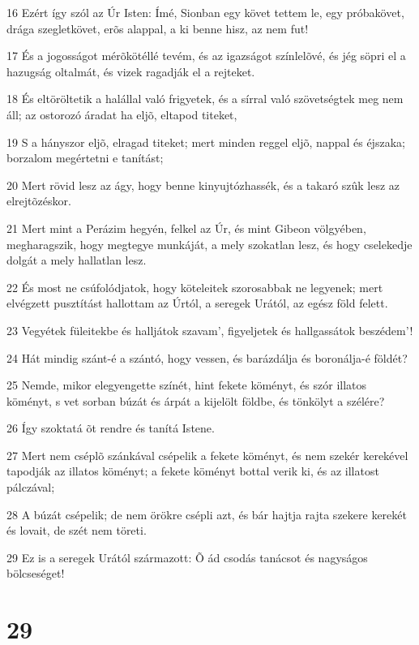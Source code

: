 \par 16 Ezért így szól az Úr Isten: Ímé, Sionban egy követ tettem le, egy próbakövet, drága szegletkövet, erõs alappal, a ki benne hisz, az nem fut!
\par 17 És a jogosságot mérõkötéllé tevém, és az igazságot színlelõvé, és jég söpri el a hazugság oltalmát, és vizek ragadják el a rejteket.
\par 18 És eltöröltetik a halállal való frigyetek, és a sírral való szövetségtek meg nem áll; az ostorozó áradat ha eljõ, eltapod titeket,
\par 19 S a hányszor eljõ, elragad titeket; mert minden reggel eljõ, nappal és éjszaka; borzalom megértetni e tanítást;
\par 20 Mert rövid lesz az ágy, hogy benne kinyujtózhassék, és a takaró szûk lesz az elrejtõzéskor.
\par 21 Mert mint a Perázim hegyén, felkel az Úr, és mint Gibeon völgyében, megharagszik, hogy megtegye munkáját, a mely szokatlan lesz, és hogy cselekedje dolgát a mely hallatlan lesz.
\par 22 És most ne csúfolódjatok, hogy köteleitek szorosabbak ne legyenek; mert elvégzett pusztítást hallottam az Úrtól, a seregek Urától, az egész föld felett.
\par 23 Vegyétek füleitekbe és halljátok szavam', figyeljetek és hallgassátok beszédem'!
\par 24 Hát mindig szánt-é a szántó, hogy vessen, és barázdálja és boronálja-é földét?
\par 25 Nemde, mikor elegyengette színét, hint fekete köményt, és szór illatos köményt, s vet sorban búzát és árpát a kijelölt földbe, és tönkölyt a szélére?
\par 26 Így szoktatá õt rendre és tanítá Istene.
\par 27 Mert nem cséplõ szánkával csépelik a fekete köményt, és nem szekér kerekével tapodják az illatos köményt; a fekete köményt bottal verik ki, és az illatost pálczával;
\par 28 A búzát csépelik; de nem örökre csépli azt, és bár hajtja rajta szekere kerekét és lovait, de szét nem töreti.
\par 29 Ez is a seregek Urától származott: Õ ád csodás tanácsot és nagyságos bölcseséget!

\chapter{29}

